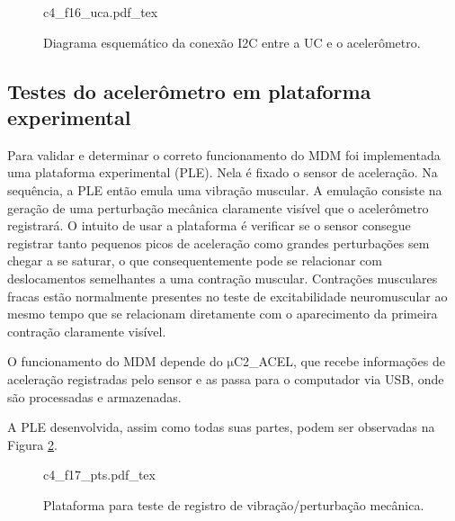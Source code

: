 
\begin{figure}
    \centering %
    \small %
    \def\svgwidth{0.9\columnwidth}%
    {c4_f16_uca.pdf_tex}
    \caption{Diagrama esquemático da conexão \acrshort{I2C} entre a \acrshort{UC} e o acelerômetro.}
    \label{fig:c4_f16_uca}
\end{figure}


\subsection*{Testes do acelerômetro em plataforma experimental}

Para validar e determinar o correto funcionamento do \acrshort{MDM} foi implementada uma plataforma experimental (\acrshort{PLE}). Nela é fixado o sensor de aceleração. Na sequência, a \acrshort{PLE} então emula uma vibração muscular. A emulação consiste na geração de uma perturbação mecânica claramente visível que o acelerômetro registrará. O intuito de usar a plataforma é verificar se o sensor consegue registrar tanto pequenos picos de aceleração como grandes perturbações sem chegar a se saturar, o que consequentemente pode se relacionar com deslocamentos semelhantes a uma contração muscular. Contrações musculares fracas estão normalmente presentes no teste de excitabilidade neuromuscular ao mesmo tempo que se relacionam diretamente com o aparecimento da primeira contração claramente visível.

O funcionamento do \acrshort{MDM} depende do $\mathrm{\mu}$C2\_ACEL, que recebe informações de aceleração registradas pelo sensor e as passa para o computador via \acrshort{USB}, onde são processadas e armazenadas.

A \acrshort{PLE} desenvolvida, assim como todas suas partes, podem ser observadas na Figura \ref{fig:c4_f17_pts}.


\begin{figure}[h]
    \centering %
    \normalsize %
    \def\svgwidth{1\columnwidth}%
    {c4_f17_pts.pdf_tex}
    \caption{Plataforma para teste de registro de vibração/perturbação mecânica.}
    \label{fig:c4_f17_pts}
\end{figure}

